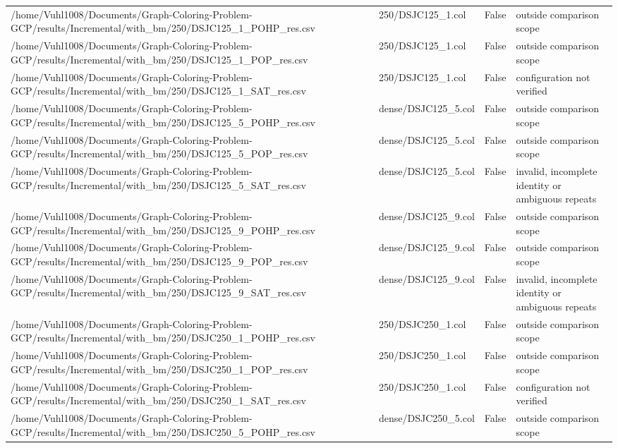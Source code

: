 \begin{table}[htbp]
\begin{tabular}{llll}
/home/Vuhl1008/Documents/Graph-Coloring-Problem-GCP/results/Incremental/with\_bm/250/DSJC125\_1\_POHP\_res.csv & 250/DSJC125\_1.col & False & outside comparison scope \\
/home/Vuhl1008/Documents/Graph-Coloring-Problem-GCP/results/Incremental/with\_bm/250/DSJC125\_1\_POP\_res.csv & 250/DSJC125\_1.col & False & outside comparison scope \\
/home/Vuhl1008/Documents/Graph-Coloring-Problem-GCP/results/Incremental/with\_bm/250/DSJC125\_1\_SAT\_res.csv & 250/DSJC125\_1.col & False & configuration not verified \\
/home/Vuhl1008/Documents/Graph-Coloring-Problem-GCP/results/Incremental/with\_bm/250/DSJC125\_5\_POHP\_res.csv & dense/DSJC125\_5.col & False & outside comparison scope \\
/home/Vuhl1008/Documents/Graph-Coloring-Problem-GCP/results/Incremental/with\_bm/250/DSJC125\_5\_POP\_res.csv & dense/DSJC125\_5.col & False & outside comparison scope \\
/home/Vuhl1008/Documents/Graph-Coloring-Problem-GCP/results/Incremental/with\_bm/250/DSJC125\_5\_SAT\_res.csv & dense/DSJC125\_5.col & False & invalid, incomplete identity or ambiguous repeats \\
/home/Vuhl1008/Documents/Graph-Coloring-Problem-GCP/results/Incremental/with\_bm/250/DSJC125\_9\_POHP\_res.csv & dense/DSJC125\_9.col & False & outside comparison scope \\
/home/Vuhl1008/Documents/Graph-Coloring-Problem-GCP/results/Incremental/with\_bm/250/DSJC125\_9\_POP\_res.csv & dense/DSJC125\_9.col & False & outside comparison scope \\
/home/Vuhl1008/Documents/Graph-Coloring-Problem-GCP/results/Incremental/with\_bm/250/DSJC125\_9\_SAT\_res.csv & dense/DSJC125\_9.col & False & invalid, incomplete identity or ambiguous repeats \\
/home/Vuhl1008/Documents/Graph-Coloring-Problem-GCP/results/Incremental/with\_bm/250/DSJC250\_1\_POHP\_res.csv & 250/DSJC250\_1.col & False & outside comparison scope \\
/home/Vuhl1008/Documents/Graph-Coloring-Problem-GCP/results/Incremental/with\_bm/250/DSJC250\_1\_POP\_res.csv & 250/DSJC250\_1.col & False & outside comparison scope \\
/home/Vuhl1008/Documents/Graph-Coloring-Problem-GCP/results/Incremental/with\_bm/250/DSJC250\_1\_SAT\_res.csv & 250/DSJC250\_1.col & False & configuration not verified \\
/home/Vuhl1008/Documents/Graph-Coloring-Problem-GCP/results/Incremental/with\_bm/250/DSJC250\_5\_POHP\_res.csv & dense/DSJC250\_5.col & False & outside comparison scope \\

\end{tabular}
\end{table}
